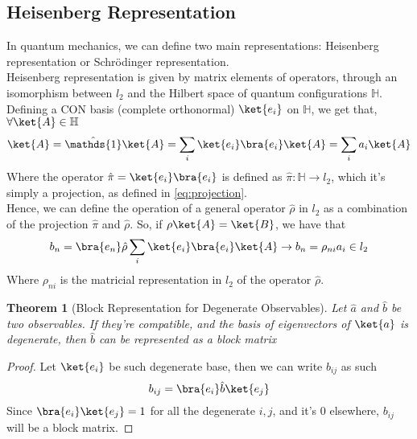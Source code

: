 \documentclass[a4paper, 11pt]{book}
\newcommand{\1}{\opr{\mathds{1}}}
\newcommand{\opr}[1]{\hat{#1}}
\newtheorem{thm}{Theorem}
\theoremstyle{plain}
\begin{document}
	\subsection{Heisenberg Representation}
	In quantum mechanics, we can define two main representations: Heisenberg representation or Schrödinger representation.\\
	Heisenberg representation is given by matrix elements of operators, through an isomorphism between $l_2$ and the Hilbert space of quantum configurations $\mathbb{H}$. Defining a CON basis (complete orthonormal) $\ket{e_i}$ on $\mathbb{H}$, we get that, $\forall\ket{A}\in\mathbb{H}$
	\begin{equation}
		\ket{A}=\1\ket{A}=\sum_i\ket{e_i}\bra{e_i}\ket{A}=\sum_ia_i\ket{A}
		\label{eq:Htol2isom}
	\end{equation}
	Where the operator $\opr{\pi}=\ket{e_i}\bra{e_i}$ is defined as $\opr{\pi}:\mathbb{H}\to l_2$, which it's simply a projection, as defined in \eqref{eq:projection}.\\
	Hence, we can define the operation of a general operator $\opr{\rho}$ in $l_2$ as a combination of the projection $\opr{\pi}$ and $\opr{\rho}$. So, if $\rho\ket{A}=\ket{B}$, we have that
	\begin{equation}
		b_n=\bra{e_n}\opr{\rho}\sum_i\ket{e_i}\bra{e_i}\ket{A}\rightarrow b_n=\rho_{ni}a_i\in l_2
		\label{eq:l2isom}
	\end{equation}
	Where $\rho_{ni}$ is the matricial representation in $l_2$ of the operator $\opr{\rho}$.\\
	\begin{thm}[Block Representation for Degenerate Observables]
		Let $\opr{a}$ and $\opr{b}$ be two observables. If they're compatible, and the basis of eigenvectors of $\ket{a}$ is degenerate, then $\opr{b}$ can be represented as a block matrix
	\end{thm}
	\begin{proof}
		Let $\ket{e_i}$ be such degenerate base, then we can write $b_{ij}$ as such
		\begin{equation*}
			b_{ij}=\bra{e_i}\opr{b}\ket{e_j}
		\end{equation*}
		Since $\bra{e_i}\ket{e_j}=1$ for all the degenerate $i,j$, and it's $0$ elsewhere, $b_{ij}$ will be a block matrix.
	\end{proof}
\end{document}
